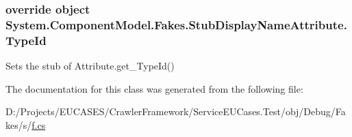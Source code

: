 \hypertarget{class_system_1_1_component_model_1_1_fakes_1_1_stub_display_name_attribute_a4f60a51b076b89726473f0197f2e6a9e}{
\subsubsection[{Type\-Id}]{\setlength{\rightskip}{0pt plus 5cm}override object System.\-Component\-Model.\-Fakes.\-Stub\-Display\-Name\-Attribute.\-Type\-Id\hspace{0.3cm}{\ttfamily [get]}}}\label{class_system_1_1_component_model_1_1_fakes_1_1_stub_display_name_attribute_a4f60a51b076b89726473f0197f2e6a9e}


Sets the stub of Attribute.\-get\-\_\-\-Type\-Id()



The documentation for this class was generated from the following file\-:\begin{DoxyCompactItemize}
\item 
D\-:/\-Projects/\-E\-U\-C\-A\-S\-E\-S/\-Crawler\-Framework/\-Service\-E\-U\-Cases.\-Test/obj/\-Debug/\-Fakes/s/\hyperlink{s_2f_8cs}{f.\-cs}\end{DoxyCompactItemize}
